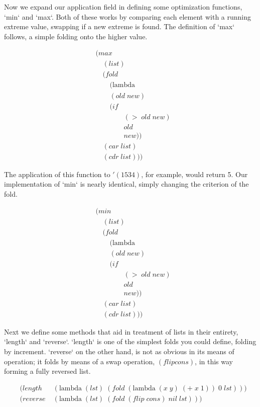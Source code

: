 Now we expand our application field in defining some optimization functions, `min` 
and `max`. Both of these works by comparing each element with a running extreme 
value, swapping if a new extreme is found. The definition of `max` follows, a 
simple folding onto the higher value.

\begin{align*}
& (max \; 
\\& \quad (list)
\\& \quad (fold \; 
\\& \qquad (\text{lambda} \; 
\\& \qquad (old \; new)
\\& \qquad (if
\\& \qquad \qquad (> \; old \; new)
\\& \qquad \qquad old
\\& \qquad \qquad new))
\\& \quad (car \; list)
\\& \quad (cdr \; list)))
\end{align*}

The application of this function to $'(1 5 3 4)$, for example, would return 5. Our 
implementation of `min` is nearly identical, simply changing the criterion of the 
fold.

\begin{align*}
& (min \; 
\\& \quad (list)
\\& \quad (fold \; 
\\& \qquad (\text{lambda} \; 
\\& \qquad (old \; new)
\\& \qquad (if
\\& \qquad \qquad (> \; old \; new)
\\& \qquad \qquad old
\\& \qquad \qquad new))
\\& \quad (car \; list)
\\& \quad (cdr \; list)))
\end{align*}

Next we define some methods that aid in treatment of lists in their entirety, 
`length` and `reverse`. `length` is one of the simplest folds you could define, 
folding by increment. `reverse` on the other hand, is not as obvious in its means 
of operation; it folds by means of a swap operation, $(flip cons)$, in this way 
forming a fully reversed list.

\begin{align*}
& (length \; &(\text{lambda} \; (lst) \; (fold \; (\text{lambda} \; (x \; y) \; (+ \; x \; 1)) \; 0 \; lst)))
\\& (reverse \; &(\text{lambda} \; (lst) \; (fold \; (flip \; cons) \; nil \; lst)))
\end{align*}

